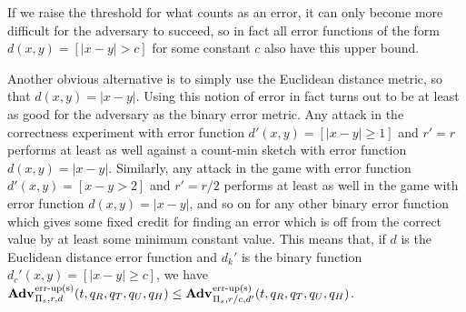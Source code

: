 If we raise the threshold for what counts as an error, it can only become more difficult for the adversary to succeed, so in fact all error functions of the form $d(x,y) = [|x - y| > c]$ for some constant $c$ also have this upper bound.

Another obvious alternative is to simply use the Euclidean distance metric, so that $d(x,y) = |x - y|$. Using this notion of error in fact turns out to be at least as good for the adversary as the binary error metric. Any attack in the correctness experiment with error function $d'(x,y) = [|x - y| \ge 1]$ and $r' = r$ performs at least as well against a count-min sketch with error function $d(x,y) = |x - y|$. Similarly, any attack in the game with error function $d'(x,y) = [x - y > 2]$ and $r' = r/2$ performs at least as well in the game with error function $d(x,y) = |x - y|$, and so on for any other binary error function which gives some fixed credit for finding an error which is off from the correct value by at least some minimum constant value. This means that, if $d$ is the Euclidean distance error function and $d_k'$ is the binary function $d_c'(x,y) = [|x - y| \ge c]$, we have $\Adv{\erreps}_{\struct_s,r,d}(t, q_R, q_T, q_U, q_H) \le \Adv{\erreps}_{\struct_s,r/c,d'}(t, q_R, q_T, q_U, q_H)$.


